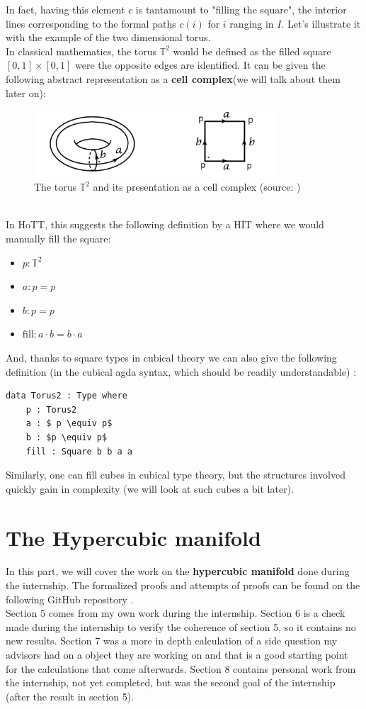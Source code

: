 \documentclass{report}
\begin{document}
In fact, having this element $c$ is tantamount to "filling the square", the interior lines corresponding to the formal paths $c(i)$ for $i$ ranging in $I$. Let's illustrate it with the example of the two dimensional torus.\\ 
In classical mathematics, the torus $\mathbb{T}^2$ would be defined as the filled square $[0,1]\times[0,1]$ were the opposite edges are identified. It can be given the following abstract representation as a \textbf{cell complex}(we will talk about them later on):
\begin{figure}[h]
  \begin{center}
    \includegraphics[height= 2.5cm]{torus.png}
    \caption{The torus $\mathbb{T}^2$ and its presentation as a cell complex (source: \cite{hatcher})}
    \label{fig:torus}
  \end{center}
\end{figure}
\\
In HoTT, this suggests the following definition by a HIT where we would manually fill the square:
\begin{itemize}
  \item $ p : \mathbb{T}^2$
  \item $a : p = p$
  \item $b : p = p $
  \item $\mathrm{fill} :  a \cdot b = b \cdot a$
\end{itemize}
And, thanks to square types in cubical theory we can also give the following definition (in the cubical agda syntax, which should be readily understandable) : 
\begin{lstlisting}[mathescape=true]
    data Torus2 : Type where
    p : Torus2
    a : $ p \equiv p$
    b : $p \equiv p$
    fill : Square b b a a
\end{lstlisting}
Similarly, one can fill cubes in cubical type theory, but the structures involved quickly gain in complexity (we will look at such cubes a bit later).
\chapter{The Hypercubic manifold} 
In this part, we will cover the work on the \textbf{hypercubic manifold} done during the internship. The formalized proofs and attempts of proofs can be found on the following GitHub repository \cite{repo}. \\
Section 5 comes from my own work during the internship. Section 6 is a check made during the internship to verify the coherence of section 5, so it contains no new results. Section 7 was a more in depth calculation of a side question my advisors had on a object they are working on and that is a good starting point for the calculations that come afterwards. Section 8 contains personal work from the internship, not yet completed, but was the second goal of the internship (after the result in section 5).
\end{document}
